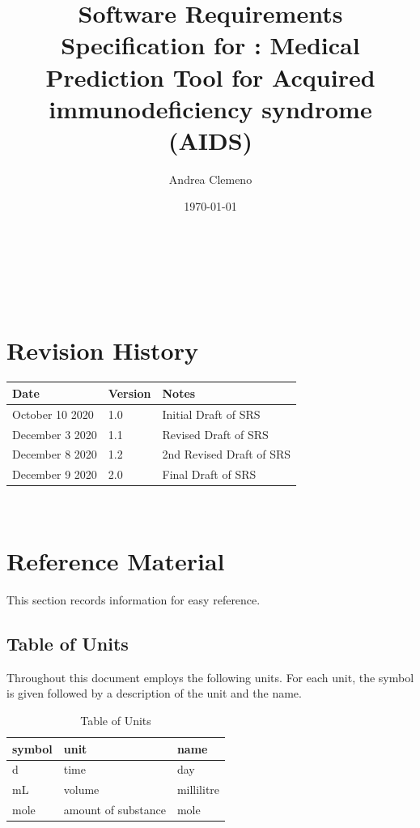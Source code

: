\documentclass[12pt]{article}
\begin{document}
\title{Software Requirements Specification for \progname: Medical Prediction 
Tool for Acquired immunodeficiency syndrome (AIDS)} 
\author{Andrea Clemeno}
\date{\today}
	
\maketitle

~\newpage


\tableofcontents

~\newpage


\section*{Revision History}

\begin{tabularx}{\textwidth}{p{3cm}p{2cm}X}
\toprule {\bf Date} & {\bf Version} & {\bf Notes}\\
\midrule
October 10 2020 & 1.0 & Initial Draft of SRS\\
December 3 2020 & 1.1 & Revised Draft of SRS\\
December 8 2020 & 1.2 & 2nd Revised Draft of SRS\\
December 9 2020 & 2.0 & Final Draft of SRS\\
\bottomrule
\end{tabularx}

~\newpage

\section{Reference Material}

This section records information for easy reference.

\subsection{Table of Units}

Throughout this document employs the following units. For each unit, the symbol 
is given followed by a
description of the unit and the name.

\renewcommand{\arraystretch}{1.2}
\begin{table}[h!]
\begin{center}
 \noindent \begin{tabular}{l l l}
    \toprule		
    \textbf{symbol} & \textbf{unit} & \textbf{name}\\
    \midrule 
    d & time & day\\
    mL & volume	& millilitre\\
    mole & amount of substance & mole\\
    \bottomrule
  \end{tabular}
  \end{center}
  	\caption{Table of Units}
\end{table}
\end{document}
